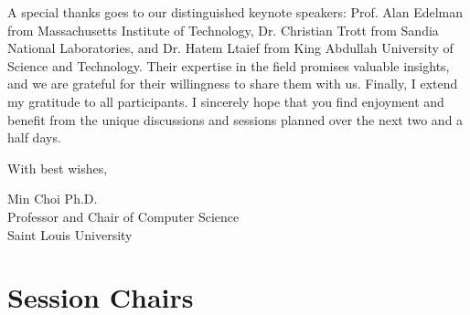 \documentclass[12pt,letterpaper]{book}
\newenvironment{conf-abstract}[4][]{
 \needspace{10\baselineskip}
 \begin{center}
 { \renewcommand\textsuperscript[1]{}
 \phantomsection\addcontentsline{toc}{section}
 {\texorpdfstring{#2 (\emph{#3})}{#2 (#3)}}
 }
 {{\large\bfseries #2}\marginnote{#1}\par}
 \medskip
 {#3\par}
 \smallskip
 {\small #4\par}
 \end{center}
}{%
 \bigskip
 \hrule
 \bigskip
}
\begin{document}
\vspace{1ex}

\noindent A special thanks goes to our distinguished keynote speakers: Prof. Alan Edelman
from Massachusetts Institute of Technology, Dr. Christian Trott from Sandia National Laboratories,
and Dr. Hatem Ltaief from King Abdullah University of Science and Technology. 
Their expertise in the field promises valuable insights, and we are
grateful for their willingness to share them with us. Finally, I extend
my gratitude to all participants. I sincerely hope that you find
enjoyment and benefit from the unique discussions and sessions planned
over the next two and a half days.

\vspace{1ex}

\noindent With best wishes,

\noindent Min Choi Ph.D.\\
\noindent Professor and Chair of Computer Science\\
\noindent Saint Louis University



%




\tableofcontents

\mainmatter



\chapter{Session Chairs}
\end{document}

